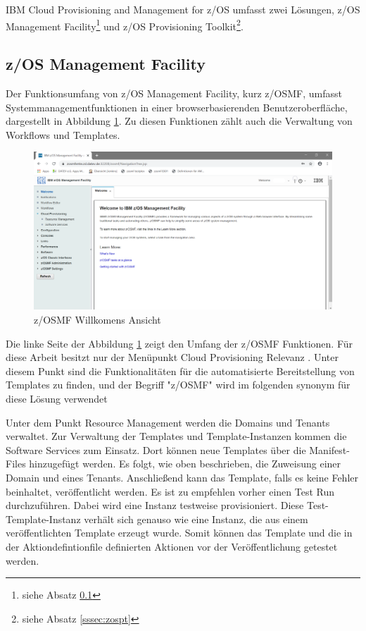 \glqq IBM Cloud Provisioning and Management for z/OS\grqq{} umfasst zwei Lösungen, \glqq z/OS Management Facility\grqq\footnote{siehe Absatz \ref{sssec:zosmf}} und \glqq z/OS Provisioning Toolkit\grqq\footnote{siehe Absatz \ref{sssec:zospt}}.

\subsection{z/OS Management Facility}\label{sssec:zosmf}
Der Funktionsumfang von z/OS Management Facility, kurz z/OSMF, umfasst Systemmanagementfunktionen
in einer browserbasierenden Benutzeroberfläche, dargestellt in Abbildung \ref{fig:zosmf_welcome}.
Zu diesen Funktionen zählt auch die Verwaltung von Workflows und Templates.

\begin{figure}[h]
\centering
\includegraphics[width=\textwidth]{figures/zosmf.png}
\caption{z/OSMF Willkomens Ansicht}
\label{fig:zosmf_welcome}
\end{figure}

Die linke Seite der Abbildung \ref{fig:zosmf_welcome} zeigt den Umfang der z/OSMF  Funktionen.
Für diese Arbeit besitzt nur der Menüpunkt \glqq Cloud Provisioning\grqq{} Relevanz .
Unter diesem Punkt sind die Funktionalitäten für die automatisierte Bereitstellung von Templates zu finden, und der Begriff "z/OSMF" wird im folgenden synonym für diese Lösung verwendet
\cite{Rotthove.2018}

Unter dem Punkt \glqq Resource Management\grqq{} werden die \glqq Domains\grqq{} und \glqq Tenants\grqq{} verwaltet.
Zur Verwaltung der Templates und Template-Instanzen kommen die \glqq Software Services\grqq{} zum Einsatz.
Dort können neue Templates über die Manifest-Files hinzugefügt werden.
Es folgt, wie oben beschrieben, die Zuweisung einer \glqq Domain\grqq{} und eines \glqq Tenants\grqq{}.
Anschließend kann das Template, falls es keine Fehler beinhaltet, veröffentlicht werden.
Es ist zu empfehlen vorher einen \glqq Test Run\grqq{} durchzuführen.
Dabei wird eine Instanz testweise provisioniert.
Diese Test-Template-Instanz verhält sich genauso wie eine Instanz, die aus einem veröffentlichten Template erzeugt wurde. 
Somit können das Template und die in der Aktiondefintionfile definierten Aktionen vor der Veröffentlichung getestet werden.
\cite{Rotthove.2018}


